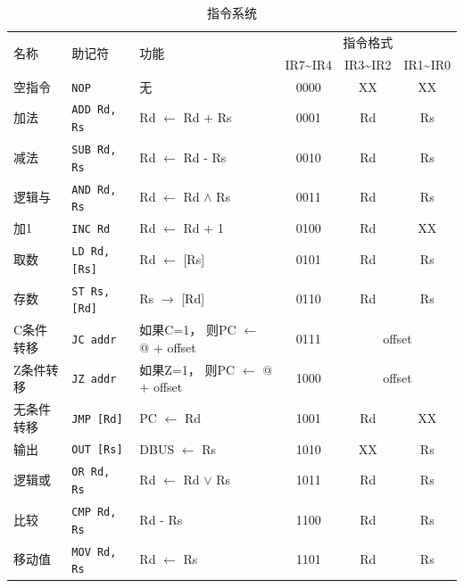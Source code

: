 \documentclass[lang=cn,11pt,a4paper,cite=authornum]{paper}
\begin{document}
\begin{table}[!htbp]
    \centering
    \caption{指令系统\label{tab:command}}
    \begin{threeparttable}
    \begin{tabular}{|l|l|l|c|c|c|}
        \hline
        \multirow{2}{*}{名称} & \multirow{2}{*}{助记符} & \multirow{2}{*}{功能} & \multicolumn{3}{c|}{指令格式} \\ \cline{4-6}
        & & & IR7\textasciitilde IR4 & IR3\textasciitilde IR2 & IR1\textasciitilde IR0 \\ \hline
        空指令 & \texttt{NOP} & 无 & 0000 & XX\tnote{1} & XX \\ \hline
        加法 & \texttt{ADD Rd, Rs} & Rd $\leftarrow$ Rd\tnote{2} + Rs\tnote{3} & 0001 & Rd & Rs \\ \hline
        减法 & \texttt{SUB Rd, Rs} & Rd $\leftarrow$ Rd - Rs & 0010 & Rd & Rs \\ \hline
        逻辑与 & \texttt{AND Rd, Rs} & Rd $\leftarrow$ Rd $\wedge$ Rs & 0011 & Rd & Rs \\ \hline
        加1 & \texttt{INC Rd} & Rd $\leftarrow$ Rd + 1 & 0100 & Rd & XX \\ \hline
        取数 & \texttt{LD Rd, [Rs]} & Rd $\leftarrow$ [Rs] & 0101 & Rd & Rs \\ \hline
        存数 & \texttt{ST Rs, [Rd]} & Rs $\rightarrow$ [Rd] & 0110 & Rd & Rs \\ \hline
        C条件转移 & \texttt{JC addr} & \makecell[l]{如果C=1，\\则PC $\leftarrow$ @\tnote{4} + offset\tnote{5}} & 0111 & \multicolumn{2}{c|}{offset} \\ \hline
        Z条件转移 & \texttt{JZ addr} & \makecell[l]{如果Z=1，\\则PC $\leftarrow$ @ + offset} & 1000 & \multicolumn{2}{c|}{offset} \\ \hline
        无条件转移 & \texttt{JMP [Rd]} & PC $\leftarrow$ Rd & 1001 & Rd & XX \\ \hline
        输出 & \texttt{OUT [Rs]} & DBUS $\leftarrow$ Rs & 1010 & XX & Rs \\ \hline
        逻辑或 & \texttt{OR Rd, Rs} & Rd $\leftarrow$ Rd $\vee$ Rs & 1011 & Rd & Rs \\ \hline
        比较 & \texttt{CMP Rd, Rs} & Rd - Rs & 1100 & Rd & Rs \\ \hline
        移动值 & \texttt{MOV Rd, Rs} & Rd $\leftarrow$ Rs & 1101 & Rd & Rs \\ \hline

\end{tabular}
\end{threeparttable}
\end{table}
\end{document}
